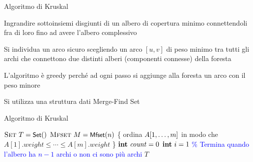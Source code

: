 \begin{frame}{Algoritmo di Kruskal}

\vspace{-9pt}
\begin{myboxtitle}[Idea]
\BIL
\item Ingrandire sottoinsiemi disgiunti di un albero di copertura minimo
connettendoli fra di loro fino ad avere l’albero complessivo
\item Si individua un arco sicuro scegliendo un arco $[u,v]$ di peso minimo tra
tutti gli archi che connettono due distinti alberi (componenti connesse) della
foresta
\item L’algoritmo è greedy perché ad ogni passo si aggiunge alla foresta un
arco con il peso minore
\EIL
\end{myboxtitle}

\begin{myboxtitle}[Implementazione]
\BIL
\item Si utilizza una struttura dati Merge-Find Set
\EIL
\end{myboxtitle}

\end{frame}

\begin{frame}{Algoritmo di Kruskal}
	
\vspace{-12pt}
\begin{Procedure}
\caption[A]{\Set\ \kruskal($\textsc{edge}[\,]\ A,\ \INTEGER\ n,\ \INTEGER\ m$)}

$\textsc{Set}\ T = \textsf{{\small Set}}()$\;
$\textsc{Mfset}\ M = \textsf{{\small Mfset}}(n)$\;
\{ ordina $A[1, \ldots, m]$ in modo che $A[1].\mathit{weight} \le \cdots \le A[m].\mathit{weight}$ \}\;
$\INTEGER\ \mathit{count} = 0$\;
$\INTEGER\ i = 1$\;
\textcolor{blue}{\% Termina quando l'albero ha $n-1$ archi o non ci sono più archi}\;
\Return $T$\;
\end{Procedure}

\end{frame}

